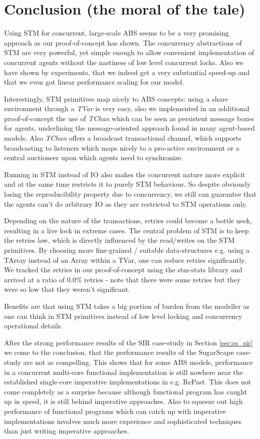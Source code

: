 \section{Conclusion (the moral of the tale)}
Using STM for concurrent, large-scale ABS seems to be a very promising approach as our proof-of-concept has shown. The concurrency abstractions of STM are very powerful, yet simple enough to allow convenient implementation of concurrent agents without the nastiness of low level concurrent locks. Also we have shown by experiments, that we indeed get a very substantial speed-up and that we even got linear performance scaling for our model. 

Interestingly, STM primitives map nicely to ABS concepts: using a share environment through a \textit{TVar} is very easy, also we implemented in an additional proof-of-concept the use of \textit{TChan} which can be seen as persistent message boxes for agents, underlining the message-oriented approach found in many agent-based models. Also \textit{TChan} offers a broadcast transactional channel, which supports broadcasting to listeners which maps nicely to a pro-active environment or a central auctioneer upon which agents need to synchronize.

Running in STM instead of IO also makes the concurrent nature more explicit and at the same time restricts it to purely STM behaviour. So despite obviously losing the reproducibility property due to concurrency, we still can guarantee that the agents can't do arbitrary IO as they are restricted to STM operations only.

Depending on the nature of the transactions, retries could become a bottle neck, resulting in a live lock in extreme cases. The central problem of STM is to keep the retries low, which is directly influenced by the read/writes on the STM primitives. By choosing more fine-grained / suitable data-structures e.g. using a TArray instead of an Array within a TVar, one can reduce retries significantly. We tracked the retries in our proof-of-concept using the stm-stats library and arrived at a ratio of 0.0\% retries - note that there were some retries but they were so low that they weren't significant.

Benefits are that using STM takes a big portion of burden from the modeller as one can think in STM primitives instead of low level locking and concurrency operational details.

After the strong performance results of the SIR case-study in Section \ref{sec:cs_sir} we come to the conclusion, that the performance results of the SugarScape case-study are not as compelling. This shows that for some ABS models, performance in a concurrent multi-core functional implementation is still nowhere near the established single-core imperative implementations in e.g. RePast. This does not come completely as a surprise because although functional program has caught up in speed, it is still behind imperative approaches. Also to squeeze out high performance of functional programs which can catch up with imperative implementations involves much more experience and sophisticated techniques than just writing imperative approaches.